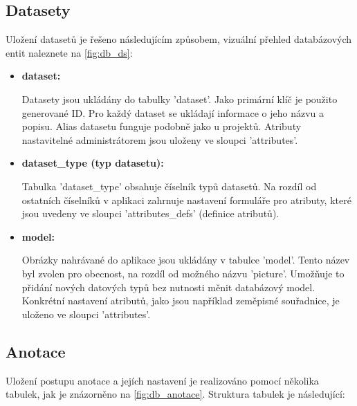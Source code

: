 \subsection{Datasety}
Uložení datasetů je řešeno následujícím způsobem, vizuální přehled databázových entit naleznete na \vref{fig:db_ds}:



\begin{itemize}
    \item \textbf{dataset:}
    
    Datasety jsou ukládány do tabulky 'dataset'. Jako primární klíč je použito generované ID. Pro každý dataset se ukládají informace o jeho názvu a popisu. Alias datasetu funguje podobně jako u projektů. Atributy nastavitelné administrátorem jsou uloženy ve sloupci 'attributes'.

    \item \textbf{dataset\_type (typ datasetu):}
    
    Tabulka 'dataset\_type' obsahuje číselník typů datasetů. Na rozdíl od ostatních číselníků v aplikaci zahrnuje nastavení formuláře pro atributy, které jsou uvedeny ve sloupci 'attributes\_defs' (definice atributů).

    \item \textbf{model:}
    
    Obrázky nahrávané do aplikace jsou ukládány v tabulce 'model'. Tento název byl zvolen pro obecnost, na rozdíl od možného názvu 'picture'. Umožňuje to přidání nových datových typů bez nutnosti měnit databázový model. Konkrétní nastavení atributů, jako jsou například zeměpisné souřadnice, je uloženo ve sloupci 'attributes'.
\end{itemize}

\subsection{Anotace}
Uložení postupu anotace a jejích nastavení je realizováno pomocí několika tabulek, jak je znázorněno na \vref{fig:db_anotace}. Struktura tabulek je následující:


